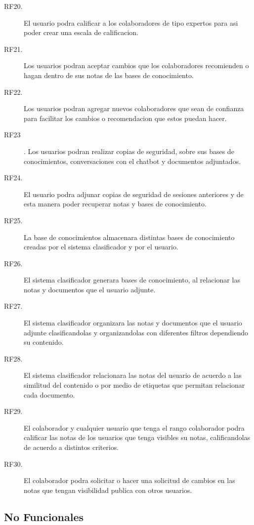 \begin{description}
    \item[RF20.] El usuario podra calificar a los colaboradores de tipo expertos para asi poder crear una escala de calificacion.
    \item[RF21.] Los usuarios podran aceptar cambios que los colaboradores recomienden o hagan dentro de sus notas de las bases de conocimiento.
    \item[RF22.] Los usuarios podran agregar nuevos colaboradores que sean de confianza para facilitar los cambios o recomendacion que estos puedan hacer.
    \item[RF23]. Los usuarios podran realizar copias de seguridad, sobre sus bases de conocimientos, conversaciones con el chatbot y documentos adjuntados.
    \item[RF24.] El usuario podra adjunar copias de seguridad de sesiones anteriores y de esta manera poder recuperar notas y bases de conocimiento.
    \item[RF25.] La base de conocimientos almacenara distintas bases de conocimiento creadas por el sistema clasificador y por el usuario.
    \item[RF26.] El sistema clasificador generara bases de conocimiento, al relacionar las notas y documentos que el usuario adjunte.
    \item[RF27.] El sistema clasificador organizara las notas y documentos que el usuario adjunte clasificandolas y organizandolas con diferentes filtros dependiendo su contenido.
    \item[RF28.] El sistema clasificador relacionara las notas del usuario de acuerdo a las similitud del contenido o por medio de etiquetas que permitan relacionar cada documento.
    \item[RF29.] El colaborador y cualquier usuario que tenga el rango colaborador podra calificar las notas de los usuarios que tenga visibles su notas, calificandolas de acuerdo a distintos criterios.
    \item[RF30.] El colaborador podra solicitar o hacer una solicitud de cambios en las notas que tengan visibilidad publica con otros usuarios.                           



\end{description}

\vspace{.5cm}

\subsection{No Funcionales}

